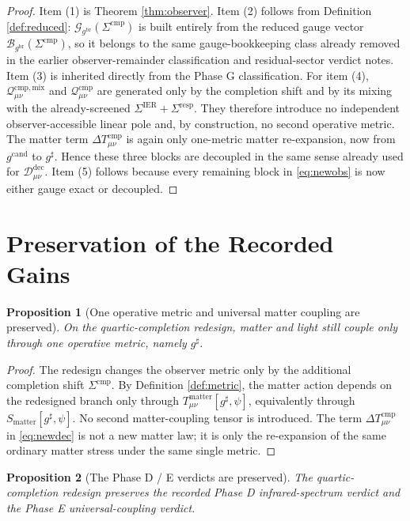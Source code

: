 \documentclass[11pt]{article}
\newcommand{\ObserverMetric}{g^{\mathrm{br}}}
\newcommand{\CandidateMetric}{g^{\mathrm{cand}}}
\newcommand{\CompletedMetric}{g^{\sharp}}
\newcommand{\BaseShift}{\Sigma^{\mathrm{IER}}}
\newcommand{\ResponseShift}{\Sigma^{\mathrm{resp}}}
\newcommand{\CompShift}{\Sigma^{\mathrm{cmp}}}
\newcommand{\DeltaTComp}{\Delta T_{\mu\nu}^{\mathrm{cmp}}}
\newcommand{\GaugeBook}{\mathcal G_{\ObserverMetric}}
\newcommand{\GaugeVec}{\mathcal B_{\ObserverMetric}}
\newcommand{\ResidualDec}{\mathcal D_{\mu\nu}^{\mathrm{dec}}}
\newcommand{\CompMix}{\mathcal Q_{\mu\nu}^{\mathrm{cmp,mix}}}
\newcommand{\CompQuad}{\mathcal Q_{\mu\nu}^{\mathrm{cmp}}}
\newcommand{\MatterAct}{S_{\mathrm{matter}}}
\newtheorem{proposition}{Proposition}
\begin{document}
\begin{proof}
Item (1) is Theorem \ref{thm:observer}. Item (2) follows from Definition \ref{def:reduced}: \(\GaugeBook(\CompShift)\) is built entirely from the reduced gauge vector \(\GaugeVec(\CompShift)\), so it belongs to the same gauge-bookkeeping class already removed in the earlier observer-remainder classification and residual-sector verdict notes. Item (3) is inherited directly from the Phase G classification. For item (4), \(\CompMix\) and \(\CompQuad\) are generated only by the completion shift and by its mixing with the already-screened \(\BaseShift+\ResponseShift\). They therefore introduce no independent observer-accessible linear pole and, by construction, no second operative metric. The matter term \(\DeltaTComp\) is again only one-metric matter re-expansion, now from \(\CandidateMetric\) to \(\CompletedMetric\). Hence these three blocks are decoupled in the same sense already used for \(\ResidualDec\). Item (5) follows because every remaining block in \eqref{eq:newobs} is now either gauge exact or decoupled.
\end{proof}

\section{Preservation of the Recorded Gains}

\begin{proposition}[One operative metric and universal matter coupling are preserved]
\label{prop:onemetric}
On the quartic-completion redesign, matter and light still couple only through one operative metric, namely \(\CompletedMetric\).
\end{proposition}

\begin{proof}
The redesign changes the observer metric only by the additional completion shift \(\CompShift\). By Definition \ref{def:metric}, the matter action depends on the redesigned branch only through \(T_{\mu\nu}^{\mathrm{matter}}[\CompletedMetric,\psi]\), equivalently through \(\MatterAct[\CompletedMetric,\psi]\). No second matter-coupling tensor is introduced. The term \(\DeltaTComp\) in \eqref{eq:newdec} is not a new matter law; it is only the re-expansion of the same ordinary matter stress under the same single metric.
\end{proof}

\begin{proposition}[The Phase D / E verdicts are preserved]
\label{prop:phaseDE}
The quartic-completion redesign preserves the recorded Phase D infrared-spectrum verdict and the Phase E universal-coupling verdict.
\end{proposition}
\end{document}
